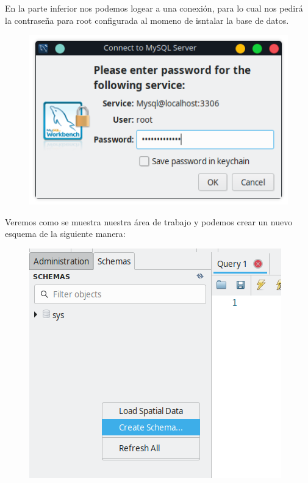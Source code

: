 \documentclass{article}
\begin{document}
En la parte inferior nos podemos logear a una conexión, para lo cual nos pedirá
la contraseña para root configurada al momeno de isntalar la base de datos.\\

\begin{figure}[h!]
  \centering
  \includegraphics[scale=0.65]{./Pictures/037_local_instance_log.png}
\end{figure}

Veremos como se muestra nuestra área de trabajo y podemos crear un nuevo
esquema de la siguiente manera:

\begin{figure}[h!]
  \centering
  \includegraphics[scale=0.68]{./Pictures/038_create_schema.png}
\end{figure}
\end{document}
